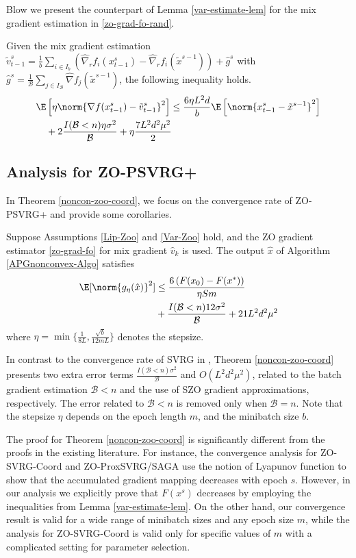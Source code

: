 Blow we present the counterpart of Lemma \ref{var-estimate-lem} for the mix gradient estimation in \eqref{zo-grad-fo-rand}.
\begin{lemma}\label{RandSGE-var-estimate-lem}
Given the mix gradient estimation $\tilde{v}_{t-1}^s = \frac{1}{b} \sum_{i\in I_b}\left(\hat{\nabla}_r f_{i}(x_{t-1}^s)-\hat{\nabla}_r f_{i}(\tilde{x}^{s-1})\right)+\hat{g}^s$ with $\hat{g}^s = \frac{1}{\mathcal{B}} \sum_{j\in I_{\mathcal{B}}} \hat{\nabla} f_j (\tilde{x}^{s-1})$, the following inequality holds. 
\begin{align}
\E&\left[\eta\norm{\nabla f(x_{t-1}^s)-{\tilde{v}_{t-1}^s}}^2\right] \leq  \frac{6\eta L^2 d}{b}\E\left[\norm{x_{t-1}^s-\tilde{x}^{s-1}}^2\right]\notag\\
&+ 2\frac{I(\mathcal{B} < n)\eta \sigma ^2}{\mathcal{B}}+\eta \frac{7L^2 d^2 \mu^2}{2}
\end{align}
\end{lemma}
\subsection{Analysis for ZO-PSVRG+}
In Theorem \ref{noncon-zoo-coord}, we focus on the convergence rate of ZO-PSVRG+ and provide some corollaries.

\begin{theorem}\label{noncon-zoo-coord}
Suppose Assumptions \ref{Lip-Zoo} and \ref{Var-Zoo} hold, and the ZO gradient estimator \eqref{zo-grad-fo} for mix gradient $\hat{v}_k$ is used. The output $\hat{x}$ of Algorithm \ref{APGnonconvex-Algo} satisfies
\begin{align}
\E[\norm{g_{\eta}(\hat{x})}^2] & \leq \frac{6\left(F(x_0) - F({x}^*)\right)}{\eta Sm}\notag\\
& + \frac{I(\mathcal{B} < n)12\sigma ^2}{\mathcal{B}}+21{L^2 d^2 \mu^2}\notag
\end{align}
where $\eta = \min\{\frac{1}{8L}, \frac{\sqrt{b}}{12mL}\}$ denotes the stepsize.
\end{theorem}
In contrast to the convergence rate of SVRG in \cite{reddi2016proximal}, Theorem \ref{noncon-zoo-coord} presents two
extra error terms $\frac{I(\mathcal{B} < n)\sigma ^2}{\mathcal{B}}$ and $O(L^2d^2\mu^2)$, related to the batch gradient estimation $\mathcal{B} < n$ and the use of SZO gradient approximations, respectively. The error related to $\mathcal{B} < n$ is removed only when $\mathcal{B} = n$. Note that the stepsize  $\eta$ depends on the epoch length $m$, and the minibatch size $b$. 

The proof for Theorem \ref{noncon-zoo-coord} is
significantly different from the proofs in the existing literature. For instance, the convergence analysis for ZO-SVRG-Coord and ZO-ProxSVRG/SAGA use the notion of Lyapunov function to show that the accumulated gradient mapping decreases with epoch $s$. However, in our analysis we explicitly prove that $F(x^s)$ decreases by employing the inequalities from Lemma \ref{var-estimate-lem}. On the other hand, our convergence result is valid for a wide range of minibatch sizes and any epoch size $m$, while the analysis for ZO-SVRG-Coord is valid only for specific values of $m$ with a complicated  setting for parameter selection.

